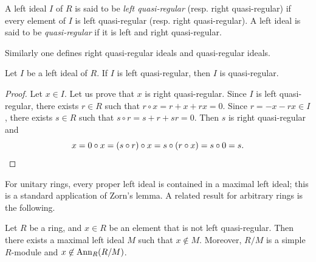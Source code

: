 \begin{definition}
  A left ideal $I$ of $R$ is said to be
  \emph{left quasi-regular} (resp. right quasi-regular) if every element of $I$ is
  left quasi-regular (resp. right quasi-regular). A left ideal
  is said to be \emph{quasi-regular} if it is left and right quasi-regular.
\end{definition}

Similarly 
one defines right quasi-regular ideals and quasi-regular ideals. 

\begin{lemma}
	\label{lemma:casiregular}
	Let $I$ be a left ideal of $R$. If $I$ is left quasi-regular, then 
	$I$ is quasi-regular.
\end{lemma}

\begin{proof}
	Let $x\in I$. Let us prove that $x$ is right quasi-regular. Since $I$ is
	left quasi-regular, there exists $r\in R$ such that $r\circ x=r+x+rx=0$. Since 
	$r=-x-rx\in I$, there exists $s\in R$ such that $s\circ
	r=s+r+sr=0$. Then $s$ is right quasi-regular and  
	\[
	x=0\circ x=(s\circ r)\circ x=s\circ (r\circ x)=s\circ 0=s.\qedhere
	\]
\end{proof}

For unitary rings, every proper left ideal is contained in a maximal left
ideal; this is a standard application of Zorn's lemma. A related result for
arbitrary rings is the following.

\begin{lemma}
	\label{lemma:maxreg}
	Let $R$ be a ring, and $x\in R$ be an element that is not left quasi-regular. Then there
	exists a maximal left ideal $M$ such that 
	$x\not\in M$. Moreover, $R/M$ is a simple $R$-module and 
	$x\not\in\operatorname{Ann}_R(R/M)$.
\end{lemma}

